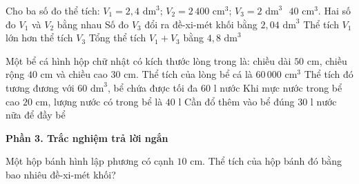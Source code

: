 \begin{ex} %
Cho ba số đo thể tích: $V_1 = 2{,}4\text{ dm}^3$; $V_2 = 2\,400\text{ cm}^3$; $V_3 = 2\text{ dm}^3\text{ }40\text{ cm}^3$.
\choiceTF
{\True Hai số đo $V_1$ và $V_2$ bằng nhau}
{\True Số đo $V_3$ đổi ra đề-xi-mét khối bằng $2{,}04\text{ dm}^3$}
{\True Thể tích $V_1$ lớn hơn thể tích $V_3$}
{Tổng thể tích $V_1 + V_3$ bằng $4{,}8\text{ dm}^3$}
\end{ex}

\begin{ex} %
Một bể cá hình hộp chữ nhật có kích thước lòng trong là: chiều dài $50\text{ cm}$, chiều rộng $40\text{ cm}$ và chiều cao $30\text{ cm}$.
\choiceTF
{\True Thể tích của lòng bể cá là $60\,000\text{ cm}^3$}
{\True Thể tích đó tương đương với $60\text{ dm}^3$, bể chứa được tối đa $60\text{ l}$ nước}
{\True Khi mực nước trong bể cao $20\text{ cm}$, lượng nước có trong bể là $40\text{ l}$}
{Cần đổ thêm vào bể đúng $30\text{ l}$ nước nữa để đầy bể}
\end{ex}

\textbf{Phần 3. Trắc nghiệm trả lời ngắn}

\begin{ex} %
Một hộp bánh hình lập phương có cạnh $10\text{ cm}$. Thể tích của hộp bánh đó bằng bao nhiêu đề-xi-mét khối?
\end{ex}

